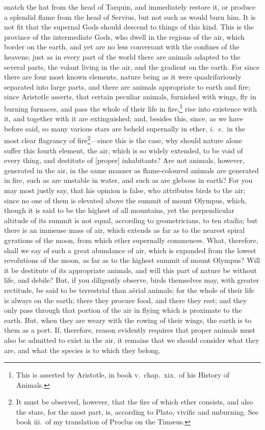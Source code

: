 \documentclass[12pt]{article}
\begin{document}
snatch the hat from the head of Tarquin, and immediately restore it, or produce
a splendid flame from the head of Servius, but not such as would burn him. It
is not fit that the supernal Gods should descend to things of this kind. This
is the province of the intermediate Gods, who dwell in the regions of the air,
which border on the earth, and yet are no less conversant with the confines of
the heavens; just as in every part of the world there are animals adapted to
the several parts, the volant living in the air, and the gradient on the earth.
For since there are four most known elements, nature being as it were
quadrifariously separated into large parts, and there are animals appropriate
to earth and fire; since Aristotle asserts, that certain peculiar animals,
furnished with wings, fly in burning furnaces, and pass the whole of their life
in fire,\footnote{This is asserted by Aristotle, in book v.~chap.~xix.~of his
History of Animals.} rise into existence with it, and together with it
are extinguished; and, besides this, since, as we have before said, so many
various stars are beheld supernally in ether, \textit{i.~e.}~in the most clear
flagrancy of fire\footnote{It must be observed, however, that the fire of which
ether consists, and also the stars, for the most part, is, according to Plato,
vivific and unburning. See book iii.~of my translation of Proclus on
the Tim{\ae}us.}---since this is the case, why should nature alone suffer
this fourth element, the air, which is so widely extended, to be void of every
thing, and destitute of [proper] inhabitants?  Are not animals, however,
generated in the air, in the same manner as flame-coloured animals are
generated in fire, such as are unstable in water, and such as are glebous in
earth? For you may most justly say, that his opinion is false, who attributes
birds to the air; since no one of them is elevated above the summit of mount
Olympus, which, though it is said to be the highest of all mountains, yet the
perpendicular altitude of its summit is not equal, according to geometricians,
to ten stadia; but there is an immense mass of air, which extends as far as to
the nearest spiral gyrations of the moon, from which ether supernally
commences. What, therefore, shall we say of such a great abundance of air,
which is expanded from the lowest revolutions of the moon, as far as to the
highest summit of mount Olympus? Will it be destitute of its appropriate
animals, and will this part of nature be without life, and debile? But, if you
diligently observe, birds themselves may, with greater rectitude, be said to be
terrestrial than a\"{e}rial animals; for the whole of their life is always on
the earth; there they procure food, and there they rest; and they only pass
through that portion of the air in flying which is proximate to the earth. But,
when they are weary with the rowing of their wings, the earth is to them as a
port. If, therefore, reason evidently requires that proper animals must also be
admitted to exist in the air, it remains that we should consider what they are,
and what the species is to which they belong.
\end{document}
